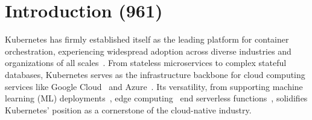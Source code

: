 \chapter{Introduction (961)}
\label{firstcontentpage} %

%
%

%

Kubernetes has firmly established itself as the leading platform for container
orchestration, experiencing widespread adoption across diverse industries and
organizations of all scales~\cite{kubernetes-adoption-statistics}. From
stateless microservices to complex stateful databases, Kubernetes serves as the
infrastructure backbone for cloud computing services like Google
Cloud~\cite{google-gke} and Azure~\cite{azure-aks}. Its versatility, from
supporting machine learning (ML) deployments~\cite{kubernetes-ai}, edge
computing~\cite{cloudraft} end serverless functions~\cite{knative, openwhisk},
solidifies Kubernetes' position as a cornerstone of the cloud-native industry.


